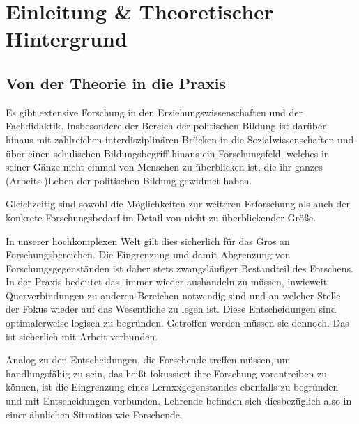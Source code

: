 



\section{Einleitung \& Theoretischer Hintergrund}

\subsection{Von der Theorie in die Praxis \label{theorie in praxis}}
Es gibt extensive Forschung in den Erziehungswissenschaften und der Fachdidaktik. Insbesondere der Bereich der politischen Bildung ist darüber hinaus mit zahlreichen interdisziplinären Brücken in die Sozialwissenschaften und über einen schulischen Bildungsbegriff hinaus ein Forschungsfeld, welches in seiner Gänze nicht einmal von Menschen zu überblicken ist, die ihr ganzes (Arbeits-)Leben der politischen Bildung gewidmet haben. 

Gleichzeitig sind sowohl die Möglichkeiten zur weiteren Erforschung als auch der konkrete Forschungsbedarf im Detail von nicht zu überblickender Größe. 

In unserer hochkomplexen Welt gilt dies sicherlich für das Gros an Forschungsbereichen. Die Eingrenzung und damit Abgrenzung von Forschungsgegenständen ist daher stets zwangsläufiger Bestandteil des Forschens. In der Praxis bedeutet das, immer wieder aushandeln zu müssen, inwieweit Querverbindungen zu anderen Bereichen notwendig sind und an welcher Stelle der Fokus wieder auf das Wesentliche zu legen ist.
Diese Entscheidungen sind optimalerweise logisch zu begründen. Getroffen werden müssen sie dennoch. Das ist sicherlich mit Arbeit verbunden. 

Analog zu den Entscheidungen, die Forschende treffen müssen, um handlungsfähig zu sein, das heißt fokussiert ihre Forschung vorantreiben zu können, ist die Eingrenzung eines Lernxxgegenstandes ebenfalls zu begründen und mit Entscheidungen verbunden. 
Lehrende befinden sich diesbezüglich also in einer ähnlichen Situation wie Forschende. 

